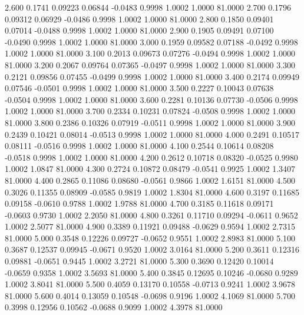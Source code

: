    2.600   0.1741   0.09223   0.06844  -0.0483   0.9998   1.0002   1.0000  81.0000
   2.700   0.1796   0.09312   0.06929  -0.0486   0.9998   1.0002   1.0000  81.0000
   2.800   0.1850   0.09401   0.07014  -0.0488   0.9998   1.0002   1.0000  81.0000
   2.900   0.1905   0.09491   0.07100  -0.0490   0.9998   1.0002   1.0000  81.0000
   3.000   0.1959   0.09582   0.07188  -0.0492   0.9998   1.0002   1.0000  81.0000
   3.100   0.2013   0.09673   0.07276  -0.0494   0.9998   1.0002   1.0000  81.0000
   3.200   0.2067   0.09764   0.07365  -0.0497   0.9998   1.0002   1.0000  81.0000
   3.300   0.2121   0.09856   0.07455  -0.0499   0.9998   1.0002   1.0000  81.0000
   3.400   0.2174   0.09949   0.07546  -0.0501   0.9998   1.0002   1.0000  81.0000
   3.500   0.2227   0.10043   0.07638  -0.0504   0.9998   1.0002   1.0000  81.0000
   3.600   0.2281   0.10136   0.07730  -0.0506   0.9998   1.0002   1.0000  81.0000
   3.700   0.2334   0.10231   0.07824  -0.0508   0.9998   1.0002   1.0000  81.0000
   3.800   0.2386   0.10326   0.07919  -0.0511   0.9998   1.0002   1.0000  81.0000
   3.900   0.2439   0.10421   0.08014  -0.0513   0.9998   1.0002   1.0000  81.0000
   4.000   0.2491   0.10517   0.08111  -0.0516   0.9998   1.0002   1.0000  81.0000
   4.100   0.2544   0.10614   0.08208  -0.0518   0.9998   1.0002   1.0000  81.0000
   4.200   0.2612   0.10718   0.08320  -0.0525   0.9980   1.0002   1.0847  81.0000
   4.300   0.2724   0.10872   0.08479  -0.0541   0.9925   1.0002   1.3407  81.0000
   4.400   0.2865   0.11086   0.08680  -0.0561   0.9866   1.0002   1.6151  81.0000
   4.500   0.3026   0.11355   0.08909  -0.0585   0.9819   1.0002   1.8304  81.0000
   4.600   0.3197   0.11685   0.09158  -0.0610   0.9788   1.0002   1.9788  81.0000
   4.700   0.3185   0.11618   0.09171  -0.0603   0.9730   1.0002   2.2050  81.0000
   4.800   0.3261   0.11710   0.09294  -0.0611   0.9652   1.0002   2.5077  81.0000
   4.900   0.3389   0.11921   0.09488  -0.0629   0.9594   1.0002   2.7315  81.0000
   5.000   0.3548   0.12226   0.09727  -0.0652   0.9551   1.0002   2.8983  81.0000
   5.100   0.3687   0.12537   0.09945  -0.0671   0.9520   1.0002   3.0164  81.0000
   5.200   0.3611   0.12316   0.09881  -0.0651   0.9445   1.0002   3.2721  81.0000
   5.300   0.3690   0.12420   0.10014  -0.0659   0.9358   1.0002   3.5693  81.0000
   5.400   0.3845   0.12695   0.10246  -0.0680   0.9289   1.0002   3.8041  81.0000
   5.500   0.4059   0.13170   0.10558  -0.0713   0.9241   1.0002   3.9678  81.0000
   5.600   0.4014   0.13059   0.10548  -0.0698   0.9196   1.0002   4.1069  81.0000
   5.700   0.3998   0.12956   0.10562  -0.0688   0.9099   1.0002   4.3978  81.0000
